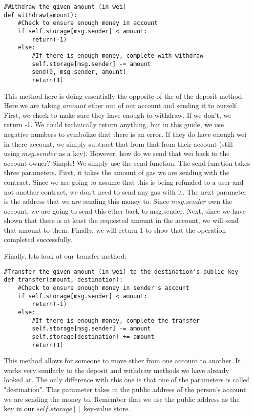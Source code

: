 \documentclass[12pt]{article}
\begin{document}
\begin{verbatim}
#Withdraw the given amount (in wei)
def withdraw(amount):
	#Check to ensure enough money in account
	if self.storage[msg.sender] < amount:
		return(-1)
	else:
		#If there is enough money, complete with withdraw
		self.storage[msg.sender] -= amount
		send(0, msg.sender, amount)
		return(1)
\end{verbatim}

This method here is doing essentially the opposite of the of the deposit method. Here we are taking $amount$ ether out of our account and sending it to ourself. First, we check to make sure they have enough to withdraw. If we don't, we return -1. We could technically return anything, but in this guide, we use negative numbers to symbolize that there is an error. If they do have enough wei in there account, we simply subtract that from that from their account (still using $msg.sender$ as a key). However, how do we send that wei back to the account owner? Simple! We simply use the send function. The send function takes three parameters. First, it takes the amount of gas we are sending with the contract. Since we are going to assume that this is being refunded to a user and not another contract, we don't need to send any gas with it. The next parameter is the address that we are sending this money to. Since $msg.sender$ own the account, we are going to send this ether back to msg.sender. Next, since we have shown that there is at least the requested amount in the account, we will send that amount to them. Finally, we will return 1 to show that the operation completed successfully.

Finally, lets look at our transfer method:

\begin{verbatim}
#Transfer the given amount (in wei) to the destination's public key
def transfer(amount, destination):
	#Check to ensure enough money in sender's account
	if self.storage[msg.sender] < amount:
		return(-1)
	else:
		#If there is enough money, complete the transfer
		self.storage[msg.sender] -= amount
		self.storage[destination] += amount
		return(1)
\end{verbatim}

This method allows for someone to move ether from one account to another. It works very similarly to the deposit and withdraw methods we have already looked at. The only difference with this one is that one of the parameters is called "destination". This parameter takes in the public address of the person's account we are sending the money to. Remember that we use the public address as the key in our $self.storage[]$ key-value store. 
\end{document}
